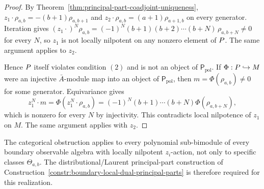 \documentclass[11pt]{memoir}
\begin{document}
\begin{proof}
  By Theorem~\ref{thm:principal-part-coadjoint-uniqueness},
  $z_1\cdot\rho_{a,b}=-(b+1)\rho_{a,b+1}$ and
  $z_2\cdot\rho_{a,b}=(a+1)\rho_{a+1,b}$ on every generator. Iteration
  gives
  $(z_1\cdot)^N\rho_{a,b}=(-1)^N(b+1)(b+2)\cdots(b+N)\,\rho_{a,b+N}\neq0$
  for every $N$, so $z_1$ is not locally nilpotent on any nonzero
  element of $P$. The same argument applies to $z_2$.

  Hence \(P\) itself violates condition \((2)\) and is not an object
  of \(\mathsf P_{\mathrm{pol}}\).  If
  \(\Phi:P\hookrightarrow M\) were an injective
  \(\bar A\)-module map into an object of \(\mathsf P_{\mathrm{pol}}\),
  then \(m=\Phi(\rho_{a,b})\neq0\) for some generator.  Equivariance gives
  \[
    z_1^N\cdot m
      =
    \Phi(z_1^N\cdot\rho_{a,b})
      =
    (-1)^N(b+1)\cdots(b+N)\Phi(\rho_{a,b+N}),
  \]
  which is nonzero for every \(N\) by injectivity.  This contradicts
  local nilpotence of \(z_1\) on \(M\).  The same argument applies with
  \(z_2\).
\end{proof}

\begin{rmk}\label{rmk:no-polynomial-categorical-status}
  The categorical obstruction applies to every polynomial sub-bimodule of
  every boundary observable algebra with locally nilpotent
  $z_i$-action, not only to specific classes $\Theta_{a,b}$. The
  distributional/Laurent principal-part construction of
  Construction~\ref{constr:boundary-local-dual-principal-parts} is
  therefore required for this realization.
\end{rmk}
\end{document}
